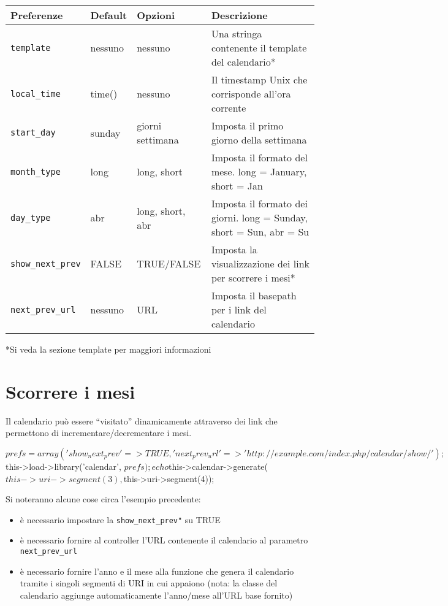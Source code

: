 \footnotesize
\begin{center}
\begin{tabularx}{\columnwidth}{lXXX}
\toprule
Preferenze & Default & Opzioni & Descrizione \\ 
\midrule
\verb|template| & nessuno  & nessuno & Una stringa contenente il template del calendario* \\
\verb|local_time| & time() & nessuno  & Il timestamp Unix che corrisponde all'ora corrente \\
\verb|start_day| & sunday & giorni settimana & Imposta il primo giorno della settimana \\
\verb|month_type| & long & long, short & Imposta il formato del mese. long = January, short = Jan \\
\verb|day_type| & abr & long, short, abr & Imposta il formato dei giorni. long = Sunday, short = Sun, abr = Su \\
\verb|show_next_prev| & FALSE & TRUE/FALSE & Imposta la visualizzazione dei link per scorrere i mesi* \\
\verb|next_prev_url| & nessuno & URL & Imposta il basepath per i link del calendario \\
\bottomrule
\end{tabularx}
\end{center}
\normalsize

*Si veda la sezione template per maggiori informazioni

\section*{Scorrere i mesi}
Il calendario può essere ``visitato'' dinamicamente attraverso dei link che permettono di incrementare/decrementare i mesi.

\begin{code}
$prefs = array (
               'show_next_prev'  => TRUE,
               'next_prev_url'   => 'http://example.com/index.php/calendar/show/'
             );

$this->load->library('calendar', $prefs);

echo $this->calendar->generate($this->uri->segment(3), $this->uri->segment(4));
\end{code}

Si noteranno alcune cose circa l'esempio precedente:

\begin{itemize}
\item è necessario impostare la \verb|show_next_prev"| su TRUE
\item è necessario fornire al controller l'URL contenente il calendario al parametro \verb|next_prev_url|
\item è necessario fornire l'anno e il mese alla funzione che genera il calendario tramite i singoli segmenti di \ac{URI} in cui appaiono (nota: la classe del calendario aggiunge automaticamente l'anno/mese all'\ac{URL} base fornito)
\end{itemize}

